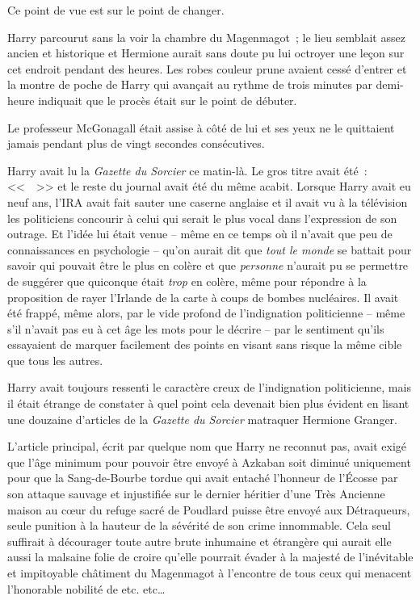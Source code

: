 Ce point de vue est sur le point de changer.

\later

Harry parcourut sans la voir la chambre du Magenmagot~; le lieu semblait assez ancien et historique et Hermione aurait sans doute pu lui octroyer une leçon sur cet endroit pendant des heures. Les robes couleur prune avaient cessé d'entrer et la montre de poche de Harry qui avançait au rythme de trois minutes par demi-heure indiquait que le procès était sur le point de débuter.

Le professeur McGonagall était assise à côté de lui et ses yeux ne le quittaient jamais pendant plus de vingt secondes consécutives.

Harry avait lu la \emph{Gazette du Sorcier} ce matin-là. Le gros titre avait été~: <<~~>> et le reste du journal avait été du même acabit. Lorsque Harry avait eu neuf ans, l'IRA avait fait sauter une caserne anglaise et il avait vu à la télévision les politiciens concourir à celui qui serait le plus vocal dans l'expression de son outrage. Et l'idée lui était venue -- même en ce temps où il n'avait que peu de connaissances en psychologie -- qu'on aurait dit que \emph{tout le monde} se battait pour savoir qui pouvait être le plus en colère et que \emph{personne} n'aurait pu se permettre de suggérer que quiconque était \emph{trop} en colère, même pour répondre à la proposition de rayer l'Irlande de la carte à coups de bombes nucléaires. Il avait été frappé, même alors, par le vide profond de l'indignation politicienne -- même s'il n'avait pas eu à cet âge les mots pour le décrire -- par le sentiment qu'ils essayaient de marquer facilement des points en visant sans risque la même cible que tous les autres.

Harry avait toujours ressenti le caractère creux de l'indignation politicienne, mais il était étrange de constater à quel point cela devenait bien plus évident en lisant une douzaine d'articles de la \emph{Gazette du Sorcier} matraquer Hermione Granger.

L'article principal, écrit par quelque nom que Harry ne reconnut pas, avait exigé que l'âge minimum pour pouvoir être envoyé à Azkaban soit diminué uniquement pour que la Sang-de-Bourbe tordue qui avait entaché l'honneur de l'Écosse par son attaque sauvage et injustifiée sur le dernier héritier d'une Très Ancienne maison au cœur du refuge sacré de Poudlard puisse être envoyé aux Détraqueurs, seule punition à la hauteur de la sévérité de son crime innommable. Cela seul suffirait à décourager toute autre brute inhumaine et étrangère qui aurait elle aussi la malsaine folie de croire qu'elle pourrait évader à la majesté de l'inévitable et impitoyable châtiment du Magenmagot à l'encontre de tous ceux qui menacent l'honorable nobilité de etc. etc…

